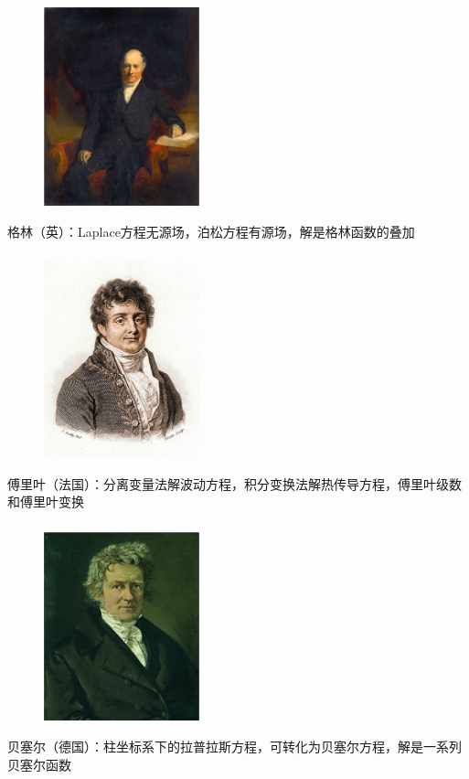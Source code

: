 \begin{frame}
	\frametitle{}
	\begin{center}
		\begin{figure}
			\includegraphics[width=4.5cm]{figs/fig1-3-2.png}	
		\end{figure}
	\end{center}
		{格林（英）：Laplace方程无源场，泊松方程有源场，解是格林函数的叠加}
\end{frame}

\begin{frame}
	\frametitle{}
	\begin{center}
		\begin{figure}
			\includegraphics[width=4.5cm]{figs/fig1-3-3.png}	
		\end{figure}
	\end{center}
	{傅里叶（法国）：分离变量法解波动方程，积分变换法解热传导方程，傅里叶级数和傅里叶变换}
\end{frame}

\begin{frame}
	\frametitle{}
	\begin{center}
		\begin{figure}
			\includegraphics[width=4.5cm]{figs/fig1-3-6.png}	
		\end{figure}
	\end{center}
	{贝塞尔（德国）：柱坐标系下的拉普拉斯方程，可转化为贝塞尔方程，解是一系列贝塞尔函数}
\end{frame}

